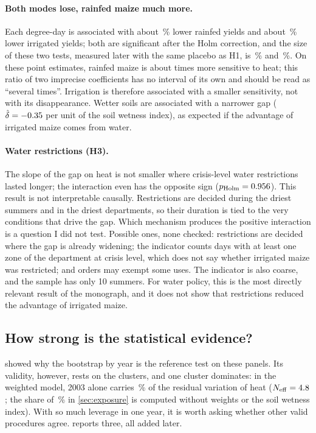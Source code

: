 \paragraph{Both modes lose, rainfed maize much more.} Each degree-day is associated with about \QoneRainfedPct\,\% lower rainfed yields and about \QoneIrrigatedPct\,\% lower irrigated yields; both are significant after the Holm correction, and the size of these two tests, measured later with the same placebo as H1, is \HtwobSize\,\% and \HtwocSize\,\%. On these point estimates, rainfed maize is about \QoneRatio{} times more sensitive to heat; this ratio of two imprecise coefficients has no interval of its own and should be read as ``several times''. Irrigation is therefore associated with a smaller sensitivity, not with its disappearance. Wetter soils are associated with a narrower gap ($\hat\delta = -0.35$ per unit of the soil wetness index), as expected if the advantage of irrigated maize comes from water.

\paragraph{Water restrictions (H3).} The slope of the gap on heat is not smaller where crisis-level water restrictions lasted longer; the interaction even has the opposite sign ($p_{\text{Holm}} = 0.956$). This result is not interpretable causally. Restrictions are decided during the driest summers and in the driest departments, so their duration is tied to the very conditions that drive the gap. Which mechanism produces the positive interaction is a question I did not test. Possible ones, none checked: restrictions are decided where the gap is already widening; the indicator counts days with at least one zone of the department at crisis level, which does not say whether irrigated maize was restricted; and orders may exempt some uses. The indicator is also coarse, and the sample has only 10 summers. For water policy, this is the most directly relevant result of the monograph, and it does not show that restrictions reduced the advantage of irrigated maize.

\subsection{How strong is the statistical evidence?}
\label{subsec:maize-inference}

 showed why the bootstrap by year is the reference test on these panels. Its validity, however, rests on the clusters, and one cluster dominates: in the weighted model, 2003 alone carries \LevThree\,\% of the residual variation of heat ($N_{\mathrm{eff}} = 4.8$; the share of \NeffMaizeShareTwoThousandThree\,\% in \cref{sec:exposure} is computed without weights or the soil wetness index). With so much leverage in one year, it is worth asking whether other valid procedures agree.  reports three, all added later.

